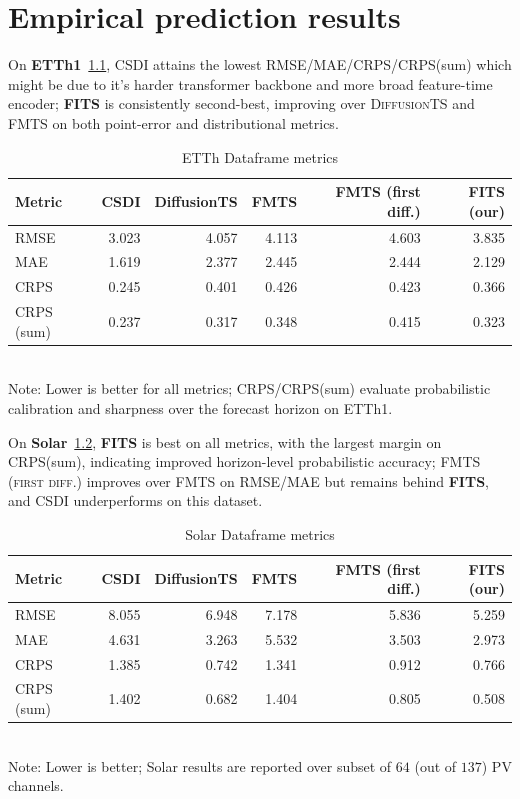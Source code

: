 \chapter{Empirical prediction results}

On \textbf{ETTh1}~\ref{tab:etth-metrics}, \textsc{CSDI} attains the lowest RMSE/MAE/CRPS/CRPS(sum) which might be due to it's harder transformer backbone and more broad feature-time encoder; \textbf{FITS} is consistently second-best, improving over \textsc{DiffusionTS} and \textsc{FMTS} on both point-error and distributional metrics.

\begin{table}[ht]
\centering
\caption{ETTh Dataframe metrics}
\label{tab:etth-metrics}
\begin{tabular}{lrrrrr}
\toprule
Metric & {CSDI} & {DiffusionTS} & {FMTS} & {FMTS (first diff.)} & {\textbf{FITS (our)}} \\
\midrule
RMSE        & 3.023 & 4.057 & 4.113 & 4.603 & 3.835 \\
MAE         & 1.619 & 2.377 & 2.445 & 2.444 & 2.129 \\
CRPS        & 0.245 & 0.401 & 0.426 & 0.423 & 0.366 \\
CRPS (sum)  & 0.237 & 0.317 & 0.348 & 0.415 & 0.323 \\
\bottomrule
\end{tabular}
\\[2pt]
{\footnotesize Note: Lower is better for all metrics; CRPS/CRPS(sum) evaluate probabilistic calibration and sharpness over the forecast horizon on ETTh1.}
\end{table}

On \textbf{Solar}~\ref{tab:solar-metrics}, \textbf{FITS} is best on all metrics, with the largest margin on CRPS(sum), indicating improved horizon-level probabilistic accuracy; \textsc{FMTS (first diff.)} improves over \textsc{FMTS} on RMSE/MAE but remains behind \textbf{FITS}, and \textsc{CSDI} underperforms on this dataset.

\begin{table}[ht]
\centering
\caption{Solar Dataframe metrics}
\label{tab:solar-metrics}
\begin{tabular}{lrrrrr}
\toprule
Metric & {CSDI} & {DiffusionTS} & {FMTS} & {FMTS (first diff.)} & {\textbf{FITS (our)}} \\
\midrule
RMSE        & 8.055 & 6.948 & 7.178 & 5.836 & 5.259 \\
MAE         & 4.631 & 3.263 & 5.532 & 3.503 & 2.973 \\
CRPS        & 1.385 & 0.742 & 1.341 & 0.912 & 0.766 \\
CRPS (sum)  & 1.402 & 0.682 & 1.404 & 0.805 & 0.508 \\
\bottomrule
\end{tabular}
\\[2pt]
{\footnotesize Note: Lower is better; Solar results are reported over subset of $64$ (out of $137$) PV channels.}
\end{table}

